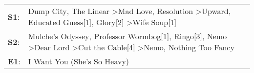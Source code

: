 \begin{supertabular}{p{0.03\textwidth}p{0.92\textwidth}}
 \textbf{S1}:  &                Dump City\textsuperscript{}, \enspace The Linear\textsuperscript{} \textgreater \enspace Mad Love\textsuperscript{}, \enspace Resolution\textsuperscript{} \textgreater \enspace Upward\textsuperscript{}, \enspace Educated Guess[1]\textsuperscript{}, \enspace Glory[2]\textsuperscript{} \textgreater \enspace Wife Soup[1]\textsuperscript{}  \enspace  \\
 \textbf{S2}:  &  Mulche's Odyssey\textsuperscript{}, \enspace Professor Wormbog[1]\textsuperscript{}, \enspace Ringo[3]\textsuperscript{}, \enspace Nemo\textsuperscript{} \textgreater \enspace Dear Lord\textsuperscript{} \textgreater \enspace Cut the Cable[4]\textsuperscript{} \textgreater \enspace Nemo\textsuperscript{}, \enspace Nothing Too Fancy\textsuperscript{}  \enspace  \\
 \textbf{E1}:  &                                                                                                                                                                                                                                                                                                                    I Want You (She's So Heavy)\textsuperscript{}  \enspace  \\
\end{supertabular}

